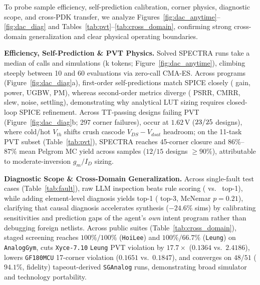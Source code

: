 \documentclass[sigconf,review,anonymous]{acmart}
\begin{document}
To probe sample efficiency, self-prediction calibration, corner physics, diagnostic scope, and cross-PDK transfer, we analyze Figures~\ref{fig:dac_anytime}--\ref{fig:dac_diag} and Tables~\ref{tab:pvt}--\ref{tab:cross_domain}, confirming strong cross-domain generalization and clear physical operating boundaries.

\textbf{Efficiency, Self-Prediction \& PVT Physics.} Solved \textsc{SPECTRA} runs take a median of \SpectraCalls{} calls and \SpectraSims{} simulations (\EOneSpectraKTok{}k tokens; Figure~\ref{fig:dac_anytime}), climbing steeply between 10 and 60 evaluations via zero-call CMA-ES. Across \NPrograms{} programs (Figure~\ref{fig:dac_diag}a), first-order self-predictions match SPICE closely (\PredGain{} gain, \PredPower{} power, \PredUGBW{} UGBW, \PredPM{} PM), whereas second-order metrics diverge (\PredPSRR{} PSRR, \PredCMRR{} CMRR, \PredSlew{} slew, \PredNoise{} noise, \PredSettle{} settling), demonstrating why analytical LUT sizing requires closed-loop SPICE refinement. Across \PVTFailDesigns{} TT-passing designs failing PVT (Figure~\ref{fig:dac_diag}b; 297 corner failures), \PVTFailLowVdd{} occur at $1.62\,\mathrm{V}$ ($23/25{}$ designs), where cold/hot $V_{th}$ shifts crush cascode $V_{DS}-V_{dsat}$ headroom; on the 11-task PVT subset (Table~\ref{tab:pvt}), \textsc{SPECTRA} reaches \PVTSpectra{} 45-corner closure and $86\%$--$87\%$ mean Pelgrom MC yield across \MCN{} samples ($12/15$ designs $\ge 90\%$), attributable to moderate-inversion $g_m/I_D$ sizing.

\textbf{Diagnostic Scope \& Cross-Domain Generalization.} Across \FaultN{} single-fault test cases (Table~\ref{tab:fault}), raw LLM inspection beats rule scoring (\FaultRawTopOne{} vs.\ \FaultRuleTopOne{} top-1), while adding element-level diagnosis yields \FaultDiagTopOne{} top-1 (\FaultDiagTopThree{} top-3, McNemar $p=0.21$), clarifying that causal diagnosis accelerates synthesis ($-24.6\%$ sims) by calibrating sensitivities and prediction gaps of the agent's \emph{own} intent program rather than debugging foreign netlists. Across public suites (Table~\ref{tab:cross_domain}), staged screening reaches $100\%/100\%$ (\texttt{HoiLee}) and $100\%/66.7\%$ (\texttt{Leung}) on \texttt{AnalogGym}, cuts \texttt{Xyce-7.10} \texttt{Leung} PVT violation by $17.7\times$ ($0.1364$ vs.\ $2.4186$), lowers \texttt{GF180MCU} 17-corner violation ($0.1651$ vs.\ $0.1847$), and converges on $48/51$ ($94.1\%$, \SGAnalogFidelity{} fidelity) tapeout-derived \texttt{SGAnalog} runs, demonstrating broad simulator and technology portability.
\end{document}
